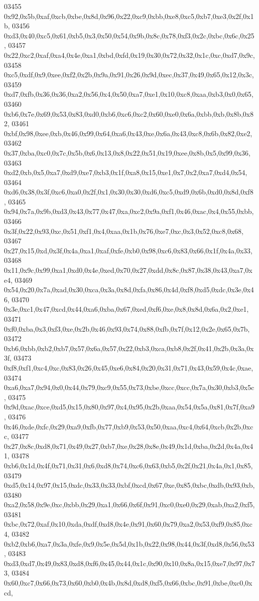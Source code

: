 \begin{DoxyCode}
03455   0x92,0x5b,0xaf,0xcb,0xbe,0x8d,0x96,0x22,0xc9,0xbb,0xe8,0xc5,0xb7,0xe3,0x2f,0x1b,
03456   0xd3,0x40,0xc5,0x61,0xb5,0x3,0x50,0x54,0x9b,0x8c,0x78,0xf3,0x2c,0xbc,0x6c,0x25,
03457   0x22,0xc2,0xaf,0xa4,0x4e,0xa1,0xbd,0xfd,0x19,0x30,0x72,0x32,0x1c,0xc,0xd7,0x9c,
03458   0xc5,0xdf,0x9,0xee,0xf2,0x2b,0x9a,0x91,0x26,0x9d,0xec,0x37,0x49,0x65,0x12,0x3c,
03459   0xd7,0xfb,0x36,0x36,0xa2,0x56,0x4,0x50,0xa7,0xe1,0x10,0xc8,0xaa,0xb3,0x0,0x65,
03460   0xb6,0x7e,0x69,0x53,0x83,0xd0,0xb6,0xc6,0xc2,0x60,0xe0,0x6a,0xbb,0xb,0x8b,0x82,
03461   0xbf,0x98,0xee,0xb,0x46,0x99,0x64,0xa6,0x43,0xe,0x6a,0x43,0xc8,0x6b,0x82,0xe2,
03462   0x37,0xba,0xc0,0x7c,0x5b,0x6,0x13,0x8,0x22,0x51,0x19,0xee,0x8b,0x5,0x99,0x36,
03463   0xd2,0xb,0x5,0xa7,0xd9,0xe7,0xb3,0x1f,0xa8,0x15,0xe1,0x7,0x2,0xa7,0xd4,0x54,
03464   0xd6,0x38,0x3f,0xc6,0xa0,0x2f,0x1,0x30,0x30,0xd6,0xc5,0xd9,0x6b,0xd0,0x8d,0xf8,
03465   0x94,0x7a,0x9b,0xd3,0x43,0x77,0x47,0xa,0xc2,0x9a,0xf1,0x46,0xac,0x4,0x55,0xbb,
03466   0x3f,0x22,0x93,0xc,0x51,0xf1,0x4,0xaa,0x1b,0x76,0xe7,0xc,0x3,0x52,0xc8,0x68,
03467   0x27,0x15,0xd,0x3f,0x4a,0xa1,0xaf,0xfe,0xb0,0x98,0xc6,0x83,0x66,0x1f,0x4a,0x33,
03468   0x11,0x9c,0x99,0xa1,0xd0,0x4e,0xed,0x70,0x27,0xdd,0x8c,0x87,0x38,0x43,0xa7,0xe4,
03469   0x54,0x20,0x7a,0xad,0x30,0xca,0x3a,0x8d,0xfa,0x86,0x4d,0xf8,0xd5,0xdc,0x3e,0x46,
03470   0x3e,0xc1,0x47,0xcd,0x44,0xa6,0xba,0x67,0xed,0xf6,0xe,0x8,0x8d,0x6a,0x2,0xe1,
03471   0xf0,0xba,0x3,0xf3,0xe,0x2b,0x46,0x93,0x74,0x88,0xfb,0x7f,0x12,0x2e,0x65,0x7b,
03472   0xb6,0xbb,0xb2,0xb7,0x57,0x6a,0x57,0x22,0xb3,0xca,0xb8,0x2f,0x41,0x2b,0x3a,0x3f,
03473   0xf8,0xf1,0xc4,0xc,0x83,0x26,0x45,0xe6,0x84,0x20,0x31,0x71,0x43,0x59,0x4c,0xae,
03474   0xa6,0xa7,0x94,0x0,0x44,0x79,0xc9,0x55,0x73,0xbe,0xcc,0xcc,0x7a,0x30,0xb3,0x5c,
03475   0x9d,0xac,0xce,0xd5,0x15,0x80,0x97,0x4,0x95,0x2b,0xaa,0x54,0x5a,0x81,0x7f,0xa9,
03476   0x46,0xde,0xfc,0x29,0xa9,0xfb,0x77,0xb9,0x53,0x50,0xaa,0xc4,0x64,0xcb,0x2b,0xcc,
03477   0x27,0x8c,0xd8,0x71,0x49,0x27,0xb7,0xe,0x28,0x8e,0x49,0x1d,0xba,0x2d,0x4a,0x41,
03478   0xb6,0x1d,0x4f,0x71,0x31,0x6,0xd8,0x74,0xc6,0x63,0xb5,0x2f,0x21,0x4a,0x1,0x85,
03479   0xd5,0x14,0x97,0x15,0xdc,0x33,0x33,0xbf,0xcd,0x67,0xe,0x85,0xbc,0xdb,0x93,0xb,
03480   0xa2,0x58,0x9e,0xc,0xbb,0x29,0xa1,0x66,0x6f,0x91,0xc0,0xe0,0x29,0xab,0xa2,0xf5,
03481   0xbc,0x72,0xaf,0x10,0xda,0xdf,0xd8,0x4e,0x91,0x60,0x79,0xa2,0x53,0xf9,0x85,0xc4,
03482   0xb2,0xb6,0xa7,0x3a,0xfe,0x9,0x5e,0x5d,0x1b,0x22,0x98,0x44,0x3f,0xd8,0x56,0x53,
03483   0xd3,0xd7,0x49,0x83,0xd8,0xf6,0x45,0x44,0x1c,0x90,0x10,0x8a,0x15,0xe7,0x97,0x73,
03484   0x60,0xc7,0x66,0x73,0x60,0xb0,0x4b,0x8d,0xd8,0xf5,0x66,0xbc,0x91,0xbe,0xc0,0xcd,

\end{DoxyCode}
